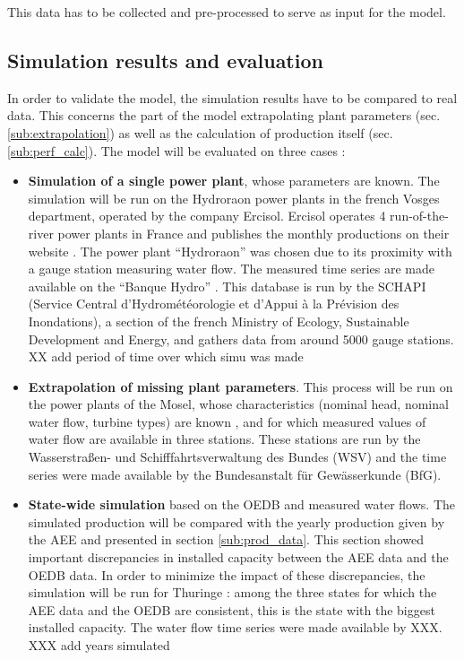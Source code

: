 This data has to be collected and pre-processed to serve as input for the model.

\subsection{Simulation results and evaluation}

In order to validate the model, the simulation results have to be compared to real data. This concerns the part of the model extrapolating plant parameters (sec. \ref{sub:extrapolation}) as well as the calculation of production itself (sec. \ref{sub:perf_calc}). \newline
The model will be evaluated on three cases : 
\begin{itemize}
 \item \textbf{Simulation of a single power plant}, whose parameters are known. The simulation will be run on the Hydroraon power plants in the french Vosges department, operated by the company Ercisol. Ercisol operates 4 run-of-the-river power plants in France and publishes the monthly productions on their website \cite{ercisol}. The power plant ``Hydroraon'' was chosen due to its proximity with a gauge station measuring water flow. The measured time series are made available on the ``Banque Hydro'' \cite{eaufrance}. This database is run by the SCHAPI (Service Central d'Hydrométéorologie et d'Appui à la Prévision des Inondations), a section of the french Ministry of Ecology, Sustainable Development and Energy, and gathers data from around 5000 gauge stations. XX add period of time over which simu was made
 \item \textbf{Extrapolation of missing plant parameters}. This process will be run on the power plants of the Mosel, whose characteristics (nominal head, nominal water flow, turbine types) are known \cite{mosel}, and for which measured values of water flow are available in three stations. These stations are run by the Wasserstraßen- und Schifffahrtsverwaltung des Bundes (WSV) and the time series were made available by the Bundesanstalt für Gewässerkunde (BfG).
 \item \textbf{State-wide simulation} based on the OEDB and measured water flows. The simulated production will be compared with the yearly production given by the AEE and presented in section \ref{sub:prod_data}. This section showed important discrepancies in installed capacity between the AEE data and the OEDB data. In order to minimize the impact of these discrepancies, the simulation will be run for Thuringe : among the three states for which the AEE data and the OEDB are consistent, this is the state with the biggest installed capacity. The water flow time series were made available by XXX. XXX add years simulated
\end{itemize}

